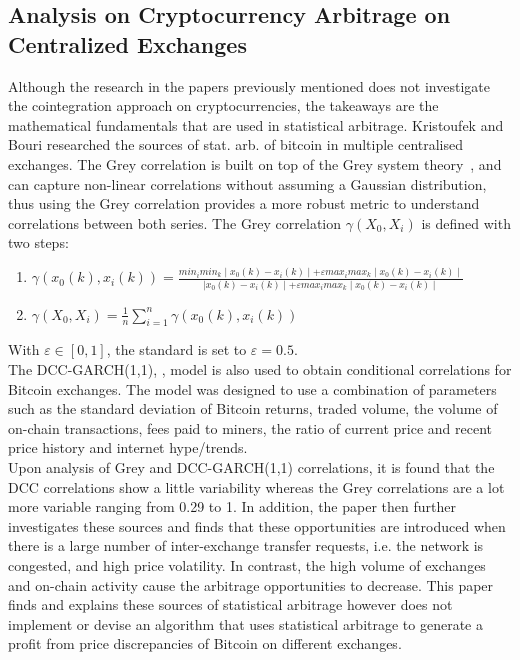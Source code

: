 \subsection{Analysis on Cryptocurrency Arbitrage on Centralized Exchanges}
Although the research in the papers previously mentioned does not investigate the cointegration approach on cryptocurrencies, the takeaways are the mathematical fundamentals that are used in statistical arbitrage. Kristoufek and Bouri researched the sources of stat. arb. of bitcoin in multiple centralised exchanges. The Grey correlation is built on top of the Grey system theory~\cite{JULONG1982288}, and can capture non-linear correlations without assuming a Gaussian distribution, thus using the Grey correlation provides a more robust metric to understand correlations between both series. The Grey correlation $\gamma(X_0, X_i)$ is defined with two steps:
\begin{enumerate}
    \item $\gamma(x_0(k), x_i(k)) = \frac{min_i min_k \mid x_0(k) - x_i(k) \mid + \varepsilon max_i max_k \mid x_0(k) - x_i(k) \mid}{\mid x_0(k) - x_i(k) \mid + \varepsilon max_i max_k \mid x_0(k) - x_i(k) \mid}$
    \item $\gamma(X_0, X_i) = \frac{1}{n} \sum_{i=1}^{n} \gamma(x_0(k), x_i(k))$
\end{enumerate}
\noindent With $\varepsilon \in [0,1]$, the standard is set to $\varepsilon = 0.5$.
\\[3mm]
The DCC-GARCH(1,1), \cite{engle2002dynamic}, model is also used to obtain conditional correlations for Bitcoin exchanges. The model was designed to use a combination of parameters such as the standard deviation of Bitcoin returns, traded volume, the volume of on-chain transactions, fees paid to miners, the ratio of current price and recent price history and internet hype/trends.
\\[3mm]
Upon analysis of Grey and DCC-GARCH(1,1) correlations, it is found that the DCC correlations show a little variability whereas the Grey correlations are a lot more variable ranging from 0.29 to 1. In addition, the paper then further investigates these sources and finds that these opportunities are introduced when there is a large number of inter-exchange transfer requests, i.e. the network is congested, and high price volatility. In contrast, the high volume of exchanges and on-chain activity cause the arbitrage opportunities to decrease. This paper finds and explains these sources of statistical arbitrage however does not implement or devise an algorithm that uses statistical arbitrage to generate a profit from price discrepancies of Bitcoin on different exchanges.
